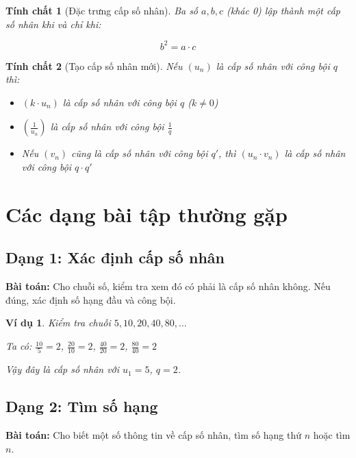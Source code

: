 \documentclass[12pt,a4paper]{report}
\newtheorem{property}{Tính chất}[section]
\newtheorem{example}{Ví dụ}[section]
\begin{document}
\begin{property}[Đặc trưng cấp số nhân]
    Ba số $a, b, c$ (khác 0) lập thành một cấp số nhân khi và chỉ khi:
    
    \[
        b^2 = a \cdot c
    \]
\end{property}

\begin{property}[Tạo cấp số nhân mới]
    Nếu $(u_n)$ là cấp số nhân với công bội $q$ thì:
    
    \begin{itemize}[label=\textbullet]
        \item $(k \cdot u_n)$ là cấp số nhân với công bội $q$ ($k \neq 0$)
        \item $\left(\frac{1}{u_n}\right)$ là cấp số nhân với công bội $\frac{1}{q}$
        \item Nếu $(v_n)$ cũng là cấp số nhân với công bội $q'$, thì $(u_n \cdot v_n)$ là cấp số nhân với công bội $q \cdot q'$
    \end{itemize}
\end{property}

\section{Các dạng bài tập thường gặp}

\subsection{Dạng 1: Xác định cấp số nhân}

\textbf{Bài toán:} Cho chuỗi số, kiểm tra xem đó có phải là cấp số nhân không. Nếu đúng, xác định số hạng đầu và công bội.

\begin{example}
    Kiểm tra chuỗi $5, 10, 20, 40, 80, \dots$
    
    Ta có:
    $\frac{10}{5} = 2$,
    $\frac{20}{10} = 2$,
    $\frac{40}{20} = 2$,
    $\frac{80}{40} = 2$
    
    Vậy đây là cấp số nhân với $u_1 = 5$, $q = 2$.
\end{example}

\subsection{Dạng 2: Tìm số hạng}

\textbf{Bài toán:} Cho biết một số thông tin về cấp số nhân, tìm số hạng thứ $n$ hoặc tìm $n$.
\end{document}
